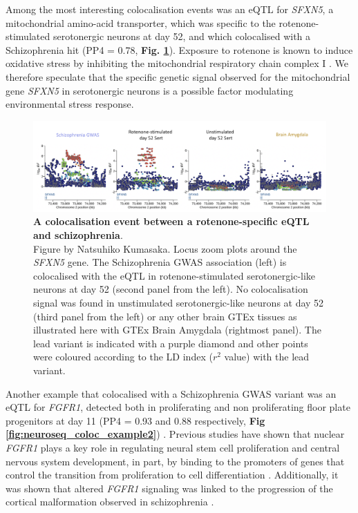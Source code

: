\newpage

Among the most interesting colocalisation events was an eQTL for \textit{SFXN5}, a mitochondrial amino-acid transporter, which was specific to the rotenone-stimulated serotonergic neurons at day 52, and which colocalised with a Schizophrenia hit (PP4 = 0.78, \textbf{Fig. \ref{fig:neuroseq_coloc_example1}}). 
Exposure to rotenone is known to induce oxidative stress by inhibiting the mitochondrial respiratory chain complex I \cite{palmer1968studies, betarbet2000chronic}. 
We therefore speculate that the specific genetic signal observed for the mitochondrial gene \textit{SFXN5} in serotonergic neurons is a possible factor modulating environmental stress response.

\begin{figure}[h]
\centering
\includegraphics[width=15.5cm]{Chapter5/Fig/neuroseq_coloc_example1_SFXN5.png}
\caption[First example of colocalisation]{\textbf{A colocalisation event between a rotenone-specific eQTL and schizophrenia}.\\
Figure by Natsuhiko Kumasaka. Locus zoom plots around the \textit{SFXN5} gene. 
The Schizophrenia GWAS association (left) is colocalised with the eQTL in rotenone-stimulated serotonergic-like neurons at day 52 (second panel from the left). 
No colocalisation signal was found in unstimulated serotonergic-like neurons at day 52 (third panel from the left) or any other brain GTEx tissues as illustrated here with GTEx Brain Amygdala (rightmost panel). 
The lead variant is indicated with a purple diamond and other points were coloured according to the LD index ($r^2$ value) with the lead variant.}
\label{fig:neuroseq_coloc_example1}
\end{figure}

Another example that colocalised with a Schizophrenia GWAS variant was an eQTL for
\textit{FGFR1}, detected both in proliferating and non proliferating floor plate progenitors at day 11 (PP4 = 0.93 and 0.88 respectively, \textbf{Fig \ref{fig:neuroseq_coloc_example2}}) . 
Previous studies have shown that nuclear \textit{FGFR1} plays a key role in regulating neural stem cell proliferation and central nervous system development, in part, by binding to the promoters of genes that control the transition from proliferation to cell differentiation \cite{ma2009molecular}. 
Additionally, it was shown that altered \textit{FGFR1} signaling was linked to the progression of the cortical malformation observed in schizophrenia \cite{stachowiak2017cerebral}.\\


